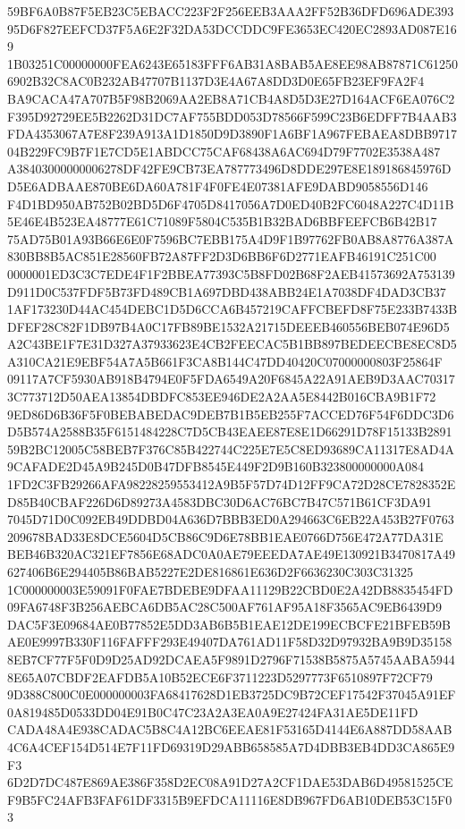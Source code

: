 \documentclass[UTF8,fontset=fandol,zihao=-4,a4paper]{ctexart}
\begin{document}
{{59BF6A0B87F5EB23C5EBACC223F2F256EEB3AAA2FF52B36DFD696ADE39395D6F827EEFCD37F5A6E2F32DA53DCCDDC9FE3653EC420EC2893AD087E169
1B03251C00000000FEA6243E65183FFF6AB31A8BAB5AE8EE98AB87871C612506902B32C8AC0B232AB47707B1137D3E4A67A8DD3D0E65FB23EF9FA2F4
BA9CACA47A707B5F98B2069AA2EB8A71CB4A8D5D3E27D164ACF6EA076C2F395D92729EE5B2262D31DC7AF755BDD053D78566F599C23B6EDFF7B4AAB3
FDA4353067A7E8F239A913A1D1850D9D3890F1A6BF1A967FEBAEA8DBB971704B229FC9B7F1E7CD5E1ABDCC75CAF68438A6AC694D79F7702E3538A487
A38403000000006278DF42FE9CB73EA787773496D8DDE297E8E189186845976DD5E6ADBAAE870BE6DA60A781F4F0FE4E07381AFE9DABD9058556D146
F4D1BD950AB752B02BD5D6F4705D8417056A7D0ED40B2FC6048A227C4D11B5E46E4B523EA48777E61C71089F5804C535B1B32BAD6BBFEEFCB6B42B17
75AD75B01A93B66E6E0F7596BC7EBB175A4D9F1B97762FB0AB8A8776A387A830BB8B5AC851E28560FB72A87FF2D3D6BB6F6D2771EAFB46191C251C00
0000001ED3C3C7EDE4F1F2BBEA77393C5B8FD02B68F2AEB41573692A753139D911D0C537FDF5B73FD489CB1A697DBD438ABB24E1A7038DF4DAD3CB37
1AF173230D44AC454DEBC1D5D6CCA6B457219CAFFCBEFD8F75E233B7433BDFEF28C82F1DB97B4A0C17FB89BE1532A21715DEEEB460556BEB074E96D5
A2C43BE1F7E31D327A37933623E4CB2FEECAC5B1BB897BEDEECBE8EC8D5A310CA21E9EBF54A7A5B661F3CA8B144C47DD40420C07000000803F25864F
09117A7CF5930AB918B4794E0F5FDA6549A20F6845A22A91AEB9D3AAC703173C773712D50AEA13854DBDFC853EE946DE2A2AA5E8442B016CBA9B1F72
9ED86D6B36F5F0BEBABEDAC9DEB7B1B5EB255F7ACCED76F54F6DDC3D6D5B574A2588B35F6151484228C7D5CB43EAEE87E8E1D66291D78F15133B2891
59B2BC12005C58BEB7F376C85B422744C225E7E5C8ED93689CA11317E8AD4A9CAFADE2D45A9B245D0B47DFB8545E449F2D9B160B323800000000A084
1FD2C3FB29266AFA98228259553412A9B5F57D74D12FF9CA72D28CE7828352ED85B40CBAF226D6D89273A4583DBC30D6AC76BC7B47C571B61CF3DA91
7045D71D0C092EB49DDBD04A636D7BBB3ED0A294663C6EB22A453B27F0763209678BAD33E8DCE5604D5CB86C9D6E78BB1EAE0766D756E472A77DA31E
BEB46B320AC321EF7856E68ADC0A0AE79EEEDA7AE49E130921B3470817A49627406B6E294405B86BAB5227E2DE816861E636D2F6636230C303C31325
1C000000003E59091F0FAE7BDEBE9DFAA11129B22CBD0E2A42DB8835454FD09FA6748F3B256AEBCA6DB5AC28C500AF761AF95A18F3565AC9EB6439D9
DAC5F3E09684AE0B77852E5DD3AB6B5B1EAE12DE199ECBCFE21BFEB59BAE0E9997B330F116FAFFF293E49407DA761AD11F58D32D97932BA9B9D35158
8EB7CF77F5F0D9D25AD92DCAEA5F9891D2796F71538B5875A5745AABA59448E65A07CBDF2EAFDB5A10B52ECE6F3711223D5297773F6510897F72CF79
9D388C800C0E000000003FA68417628D1EB3725DC9B72CEF17542F37045A91EF0A819485D0533DD04E91B0C47C23A2A3EA0A9E27424FA31AE5DE11FD
CADA48A4E938CADAC5B8C4A12BC6EEAE81F53165D4144E6A887DD58AAB4C6A4CEF154D514E7F11FD69319D29ABB658585A7D4DBB3EB4DD3CA865E9F3
6D2D7DC487E869AE386F358D2EC08A91D27A2CF1DAE53DAB6D49581525CEF9B5FC24AFB3FAF61DF3315B9EFDCA11116E8DB967FD6AB10DEB53C15F03
}}
\end{document}
